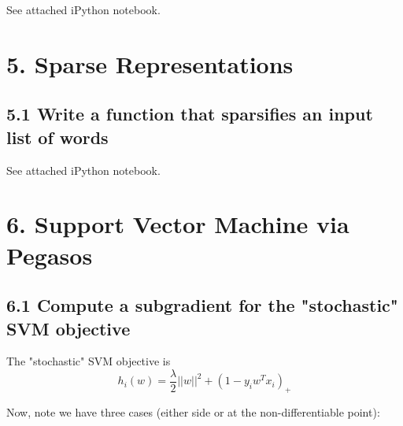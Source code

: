 \documentclass[paper=a4, fontsize=11pt]{scrartcl} %
\numberwithin{equation}{section} %
\numberwithin{figure}{section} %
\numberwithin{table}{section} %
\begin{document}
See attached iPython notebook.


\section*{5. Sparse Representations}
\subsection*{5.1 Write a function that sparsifies an input list of words}

See attached iPython notebook.



\section*{6. Support Vector Machine via Pegasos}
\subsection*{6.1 Compute a subgradient for the "stochastic" SVM objective}

The "stochastic" SVM objective is
\[h_i(w) = \frac{\lambda}{2} ||w||^2 + (1 - y_i w^T x_i)_+\]

Now, note we have three cases (either side or at the non-differentiable point):
\end{document}
